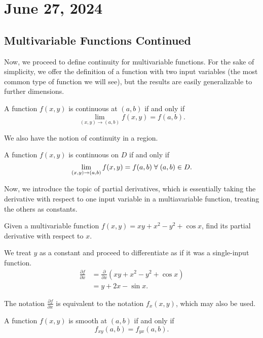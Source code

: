 \chapter{June 27, 2024}

\section{Multivariable Functions Continued}

Now, we proceed to define continuity for multivariable functions. For the sake of simplicity, we offer the definition of a function with two input variables (the most common type of function we will see), but the results are easily generalizable to further dimensions.

\begin{definition}
    A function $f(x, y)$ is continuous at $(a, b)$ if and only if
    \[\lim_{(x, y) \to (a, b)} f(x, y) = f(a, b).\]
\end{definition}

We also have the notion of continuity in a region.

\begin{definition}
    A function $f(x, y)$ is continuous on $D$ if and only if
    \[\lim_{(x, y) \to (a, b)} f(x, y) = f(a, b) \; \forall \; (a, b) \in D.\]
\end{definition}

Now, we introduce the topic of partial derivatives, which is essentially taking the derivative with respect to one input variable in a multiavariable function, treating the others as constants.

\begin{example}
    Given a multivariable function $f(x, y) = xy + x^{2} - y^{2} + \cos x$, find its partial derivative with respect to $x$.

    \begin{soln}
        We treat $y$ as a constant and proceed to differentiate as if it was a single-input function.
        \begin{align*}
            \frac{\partial f}{\partial x} &= \frac{\partial}{\partial x}\left(xy + x^{2} - y^{2} + \cos x\right) \\
            &= y + 2x - \sin x.
        \end{align*}
    \end{soln}
\end{example}

\begin{remark}
    The notation $\frac{\partial f}{\partial x}$ is equivalent to the notation $f_{x}(x, y)$, which may also be used.
\end{remark}

\begin{proposition}
    A function $f(x, y)$ is smooth at $(a, b)$ if and only if
    \[f_{xy}(a, b) = f_{yx}(a, b).\]
\end{proposition}